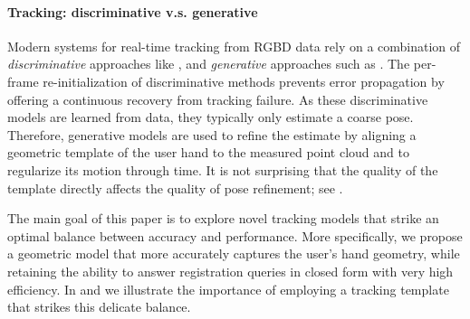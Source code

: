 \paragraph{Tracking: discriminative v.s. generative}
Modern systems for real-time tracking from RGBD data  \cite{sridhar2015fast,sharp2015accurate} rely on a combination of \emph{discriminative} approaches like \cite{keskin2012hand}, and \emph{generative} approaches such as \cite{oiko2011hand}. The per-frame re-initialization of discriminative methods prevents error propagation by offering a continuous recovery from tracking failure. As these discriminative models are learned from data, they typically only estimate a coarse pose. Therefore, generative models are used to refine the estimate by aligning a geometric template of the user hand to the measured point cloud and to regularize its motion through time. It is not surprising that the quality of the template directly affects the quality of pose refinement; see . 



The main goal of this paper is to explore novel tracking models that strike an optimal balance between accuracy and performance.
% 
% 
More specifically, we propose a geometric model that more accurately captures the user's hand geometry, while retaining the ability to answer registration queries in closed form with very high efficiency. In  and  we illustrate the importance of employing a tracking template that strikes this delicate balance.

